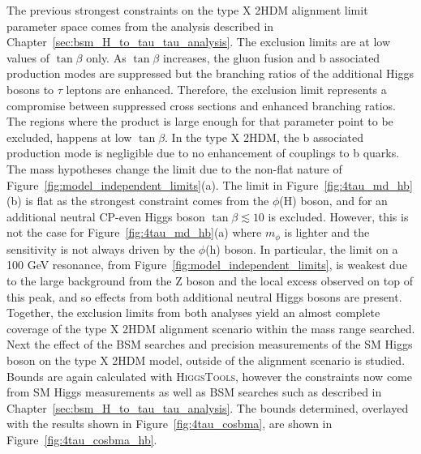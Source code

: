 The previous strongest constraints on the type X \ac{2HDM} alignment limit parameter space comes from the analysis described in Chapter~\ref{sec:bsm_H_to_tau_tau_analysis}.
The exclusion limits are at low values of $\tan\beta$ only.
As $\tan\beta$ increases, the gluon fusion and b associated production modes are suppressed but the branching ratios of the additional Higgs bosons to $\tau$ leptons are enhanced.
Therefore, the exclusion limit represents a compromise between suppressed cross sections and enhanced branching ratios. 
The regions where the product is large enough for that parameter point to be excluded, happens at low $\tan\beta$.
In the type X \ac{2HDM}, the b associated production mode is negligible due to no enhancement of couplings to b quarks.
The mass hypotheses change the limit due to the non-flat nature of Figure~\ref{fig:model_independent_limits}(a).
The limit in Figure~\ref{fig:4tau_md_hb}(b) is flat as the strongest constraint comes from the $\phi$(H) boson, and for an additional neutral \ac{CP}-even Higgs boson $\tan\beta \lesssim 10$ is excluded.
However, this is not the case for Figure~\ref{fig:4tau_md_hb}(a) where $m_{\phi}$ is lighter and the sensitivity is not always driven by the $\phi$(h) boson.
In particular, the limit on a 100 GeV resonance, from Figure~\ref{fig:model_independent_limits}, is weakest due to the large background from the Z boson and the local excess observed on top of this peak, and so effects from both additional neutral Higgs bosons are present.
Together, the exclusion limits from both analyses yield an almost complete coverage of the type X 2HDM alignment scenario within the mass range searched. \\

Next the effect of the \ac{BSM} searches and precision measurements of the \ac{SM} Higgs boson on the type X \ac{2HDM} model, outside of the alignment scenario is studied.
Bounds are again calculated with \textsc{HiggsTools}, however the constraints now come from \ac{SM} Higgs measurements as well as \ac{BSM} searches such as described in Chapter~\ref{sec:bsm_H_to_tau_tau_analysis}.
The bounds determined, overlayed with the results shown in Figure~\ref{fig:4tau_cosbma}, are shown in Figure~\ref{fig:4tau_cosbma_hb}. \\


